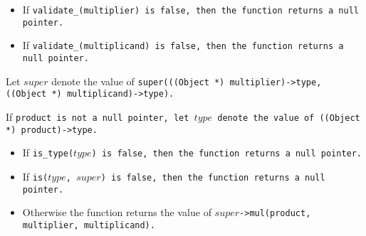 \begin{itemize}

\item If \tt{validate_(multiplier)} is \tt{false},
then the function returns a null pointer.

\item If \tt{validate_(multiplicand)} is \tt{false},
then the function returns a null pointer.

\end{itemize}

Let $super$ denote the value of
\tt{super(((Object *) multiplier)->type, ((Object *) multiplicand)->type)}.

If \tt{product} is not a null pointer, let $type$
denote the value of \tt{((Object *) product)->type}.

\begin{itemize}

\item If \tt{is_type(}$type$\tt{)} is \tt{false},
then the function returns a null pointer.

\item If \tt{is(}$type$\tt{,} $super$\tt{)} is \tt{false},
then the function returns a null pointer.

\item Otherwise the function returns the value
of $super$\tt{->mul(product, multiplier, multiplicand)}.

\end{itemize}
